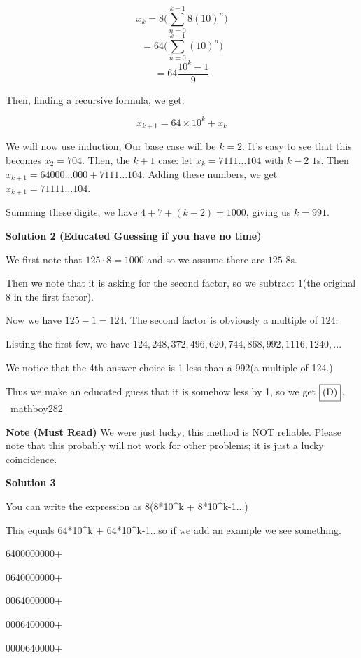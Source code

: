 \begin{enumerate}
 
 \[x_k=8\biggr(\sum_{n=0}^{k-1}8(10)^n\biggr)\]
 \[=64\biggr(\sum_{n=0}^{k-1}(10)^n\biggr)\]
 \[=64\frac{10^{k}-1}{9}\]

 Then, finding a recursive formula, we get:

 
 \[x_{k+1}=64\times 10^{k}+x_k\]

 We will now use induction, Our base case will be $k=2$. It's easy to see that this becomes $x_2=704$. Then, the $k+1$ case: let $x_k=7111\dots104$ with $k-2$ $1$s. Then $x_{k+1}=64000\dots000+7111\dots104$. Adding these numbers, we get $x_{k+1}=71111\dots104$. 

 Summing these digits, we have $4+7+(k-2)=1000$, giving us $k=991$.

 



\textbf{Solution 2 (Educated Guessing if you have no time)}

We first note that $125 \cdot 8 = 1000$ and so we assume there are $125$ 8s.

 Then we note that it is asking for the second factor, so we subtract $1$(the original $8$ in the first factor).

 Now we have $125-1=124.$ The second factor is obviously a multiple of $124$.

 Listing the first few, we have $124, 248, 372, 496, 620, 744, 868, 992, 1116, 1240, ...$

 We notice that the 4th answer choice is 1 less than a 992(a multiple of 124.)

 Thus we make an educated guess that it is somehow less by 1, so we get $\fbox{(D)}$. ~mathboy282

 \textbf{Note (Must Read)} We were just lucky; this method is NOT reliable. Please note that this probably will not work for other problems; it is just a lucky coincidence.

 



\textbf{Solution 3}

You can write the expression as 8(8*10\textasciicircum{}k + 8*10\textasciicircum{}k-1...)

 This equals 64*10\textasciicircum{}k + 64*10\textasciicircum{}k-1...so if we add an example we see something.

 6400000000+

 0640000000+

 0064000000+

 0006400000+

 0000640000+


\end{enumerate}
